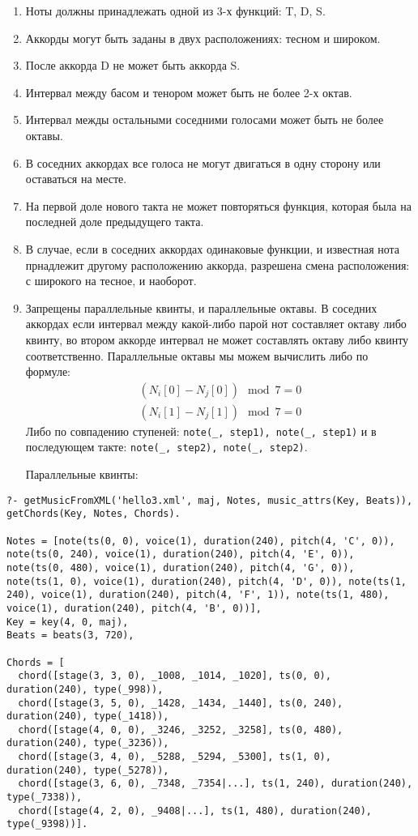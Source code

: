 \documentclass[12pt]{article}
\begin{document}
\begin{enumerate}
\item Ноты должны принадлежать одной из 3-х функций: T, D, S.
\item Аккорды могут быть заданы в двух расположениях: тесном и широком.
\item После аккорда D не может быть аккорда S.
\item Интервал между басом и тенором может быть не более 2-х октав.
\item Интервал межды остальными соседними голосами может быть не более октавы.
\item В соседних аккордах все голоса не могут двигаться в одну сторону или оставаться на месте.
\item На первой доле нового такта не может повторяться функция, которая была на последней доле предыдущего такта.
\item В случае, если в соседних аккордах одинаковые функции, и известная нота прнадлежит другому расположению аккорда, разрешена смена расположения: с широкого на тесное, и наоборот.
\item Запрещены параллельные квинты, и параллельные октавы. В соседних аккордах если интервал между какой-либо парой нот составляет октаву либо квинту, во втором аккорде интервал не может составлять октаву либо квинту соответственно.
  Параллельные октавы мы можем вычислить либо по формуле:
  \begin{equation}
    \begin{aligned}
      (N_i[0] - N_j[0]) \mod 7 = 0\\
      (N_i[1] - N_j[1]) \mod 7 = 0
    \end{aligned}
  \end{equation}
  Либо по совпадению ступеней: {\tt note(\_, step1), note(\_, step1)} и в последующем такте: {\tt note(\_, step2), note(\_, step2)}.

  Параллельные квинты:
\end{enumerate}
\begin{verbatim}
?- getMusicFromXML('hello3.xml', maj, Notes, music_attrs(Key, Beats)), getChords(Key, Notes, Chords).

Notes = [note(ts(0, 0), voice(1), duration(240), pitch(4, 'C', 0)), note(ts(0, 240), voice(1), duration(240), pitch(4, 'E', 0)), note(ts(0, 480), voice(1), duration(240), pitch(4, 'G', 0)), note(ts(1, 0), voice(1), duration(240), pitch(4, 'D', 0)), note(ts(1, 240), voice(1), duration(240), pitch(4, 'F', 1)), note(ts(1, 480), voice(1), duration(240), pitch(4, 'B', 0))],
Key = key(4, 0, maj),
Beats = beats(3, 720),

Chords = [
  chord([stage(3, 3, 0), _1008, _1014, _1020], ts(0, 0), duration(240), type(_998)),
  chord([stage(3, 5, 0), _1428, _1434, _1440], ts(0, 240), duration(240), type(_1418)),
  chord([stage(4, 0, 0), _3246, _3252, _3258], ts(0, 480), duration(240), type(_3236)),
  chord([stage(3, 4, 0), _5288, _5294, _5300], ts(1, 0), duration(240), type(_5278)),
  chord([stage(3, 6, 0), _7348, _7354|...], ts(1, 240), duration(240), type(_7338)),
  chord([stage(4, 2, 0), _9408|...], ts(1, 480), duration(240), type(_9398))].
\end{verbatim}
\end{document}
